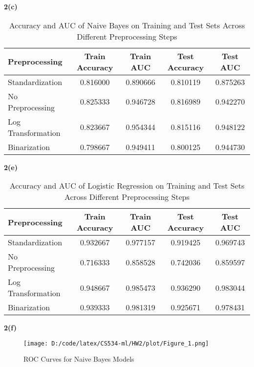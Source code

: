 \documentclass[10pt,letterpaper]{article}
\begin{document}
            \textbf{2(c)}
                \begin{table}[H]
                    \centering
                    \begin{tabular}{lcccc}
                        \toprule
                        \textbf{Preprocessing} & \textbf{Train Accuracy} & \textbf{Train AUC} & \textbf{Test Accuracy} & \textbf{Test AUC} \\
                        \midrule
                        Standardization & 0.816000 & 0.890666 & 0.810119 & 0.875263 \\
                        No Preprocessing & 0.825333 & 0.946728 & 0.816989 & 0.942270 \\
                        Log Transformation & 0.823667 & 0.954344 & 0.815116 & 0.948122 \\
                        Binarization & 0.798667 & 0.949411 & 0.800125 & 0.944730 \\
                        \bottomrule
                    \end{tabular}
                    \caption{Accuracy and AUC of Naive Bayes on Training and Test Sets Across Different Preprocessing Steps}
                    \label{tab:nb_results}
                \end{table}
            \textbf{2(e)}
                \begin{table}[H]
                    \centering
                    \begin{tabular}{lcccc}
                        \toprule
                        \textbf{Preprocessing} & \textbf{Train Accuracy} & \textbf{Train AUC} & \textbf{Test Accuracy} & \textbf{Test AUC} \\
                        \midrule
                        Standardization & 0.932667 & 0.977157 & 0.919425 & 0.969743 \\
                        No Preprocessing & 0.716333 & 0.858528 & 0.742036 & 0.859597 \\
                        Log Transformation & 0.948667 & 0.985473 & 0.936290 & 0.983044 \\
                        Binarization & 0.939333 & 0.981319 & 0.925671 & 0.978431 \\
                        \bottomrule
                    \end{tabular}
                    \caption{Accuracy and AUC of Logistic Regression on Training and Test Sets Across Different Preprocessing Steps}
                    \label{tab:lr_results}
                \end{table}
            \textbf{2(f)} 
                \begin{figure}[H]
                    \centering
                    \texttt{[image: D:/code/latex/CS534-ml/HW2/plot/Figure\_1.png]}
                    \caption{ROC Curves for Naive Bayes Models}
                    \label{fig:nb_roc}
                \end{figure}
                
\end{document}

